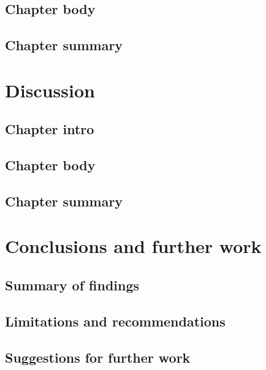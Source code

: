    \section{Chapter body}
   \section{Chapter summary}

\chapter{Discussion}
   \section{Chapter intro}
   \section{Chapter body}
   \section{Chapter summary}

\chapter{Conclusions and further work}
   \section{Summary of findings}
   \section{Limitations and recommendations}
   \section{Suggestions for further work}